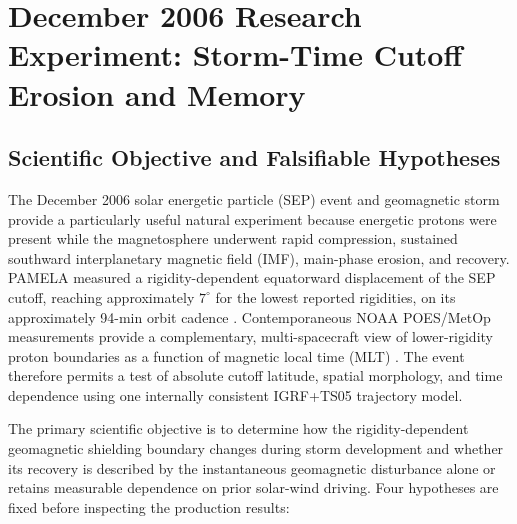 
\section{December 2006 Research Experiment: Storm-Time Cutoff Erosion and Memory}
\label{sec:experiment}

\subsection{Scientific Objective and Falsifiable Hypotheses}

The December 2006 solar energetic particle (SEP) event and geomagnetic storm
provide a particularly useful natural experiment because energetic protons
were present while the magnetosphere underwent rapid compression, sustained
southward interplanetary magnetic field (IMF), main-phase erosion, and
recovery. PAMELA measured a rigidity-dependent equatorward displacement of the
SEP cutoff, reaching approximately $7^{\circ}$ for the lowest reported
rigidities, on its approximately 94-min orbit cadence
\cite{Adriani-2016-SW}. Contemporaneous NOAA POES/MetOp measurements provide a
complementary, multi-spacecraft view of lower-rigidity proton boundaries as a
function of magnetic local time (MLT) \cite{Dmitriev-2010-JGR}. The event
therefore permits a test of absolute cutoff latitude, spatial morphology, and
time dependence using one internally consistent IGRF+TS05 trajectory model.

The primary scientific objective is to determine how the rigidity-dependent
geomagnetic shielding boundary changes during storm development and whether
its recovery is described by the instantaneous geomagnetic disturbance alone
or retains measurable dependence on prior solar-wind driving. Four hypotheses
are fixed before inspecting the production results:

